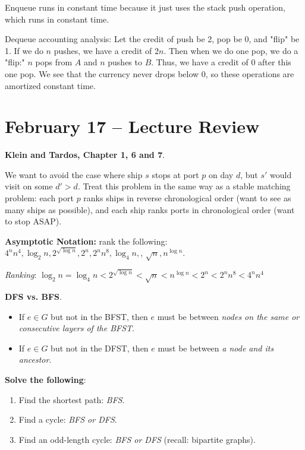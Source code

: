 \documentclass[11pt]{article}
\begin{document}
Enqueue runs in constant time because it just uses the stack push operation, which runs in constant time.

Dequeue accounting analysis:
Let the credit of push be 2, pop be 0, and "flip" be 1. If we do $n$ pushes, we have a credit of $2n$. Then when we do one pop, we do a "flip:" $n$ pops from $A$ and $n$ pushes to $B$. Thus, we have a credit of 0 after this one pop. We see that the currency never drops below 0, so these operations are amortized constant time.

\newpage
\section{February 17 -- Lecture Review}
\begin{exmp}
    \textbf{Klein and Tardos, Chapter 1, 6 and 7}.
\end{exmp}
We want to avoid the case where ship $s$ stops at port $p$ on day $d$, but $s'$ would visit on some $d' > d$. Treat this problem in the same way as a stable matching problem: each port $p$ ranks ships in reverse chronological order (want to see as many ships as possible), and each ship ranks ports in chronological order (want to stop ASAP).
\begin{exmp}
    \textbf{Asymptotic Notation:} rank the following: $4^nn^4, \log_2{n}, 2^{\sqrt{\log n}}, 2^n, 2^nn^8, \log_4{n},$, $\sqrt{n}, n^{\log n}$.
\end{exmp}
\textit{Ranking}: $\log_2{n} = \log_4{n} < 2^{\sqrt{\log n}} < \sqrt{n} < n^{\log n} <  2^n <  2^nn^8 < 4^nn^4$

\begin{exmp}
    \textbf{DFS vs. BFS}. 
    \begin{itemize}
        \item If $e \in G$ but not in the BFST, then $e$ must be between \textit{nodes on the same or consecutive layers of the BFST}.
        \item If $e \in G$ but not in the DFST, then $e$ must be between \textit{a node and its ancestor}.
    \end{itemize}
    \textbf{Solve the following}:
    \begin{enumerate}
        \item Find the shortest path: \textit{BFS}.
        \item Find a cycle: \textit{BFS or DFS}.
        \item Find an odd-length cycle: \textit{BFS or DFS} (recall: bipartite graphs).
    \end{enumerate}
\end{exmp}
\end{document}
